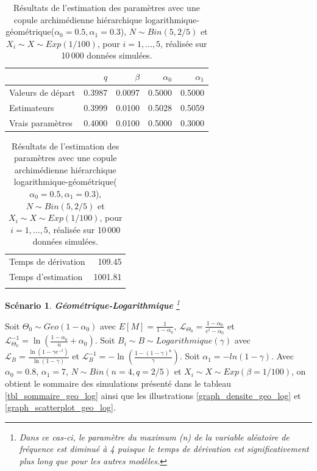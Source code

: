 \documentclass{article}
\newtheorem{Scenario}{Scénario}
\begin{document}
	\begin{table}[H]
		\centering
		\begin{tabular}{lrrrr}
			\hline
			& $q$ & $\beta$ & $\alpha_0$ & $\alpha_1$ \\ 
			\hline
			Valeurs de départ & 0.3987 & 0.0097 & 0.5000 & 0.5000 \\ 
			Estimateurs & 0.3999 & 0.0100 & 0.5028 & 0.5059 \\ 
			Vrais paramètres & 0.4000 & 0.0100 & 0.5000 & 0.3000 \\
			\hline
		\end{tabular}
		\begin{tabular}{lr}
			\hline
			&  \\ 
			\hline
			Temps de dérivation & 109.45 \\ 
			Temps d'estimation & 1001.81 \\ 
			\\
			\hline
		\end{tabular}
		\caption[Résultats du scénario \ref{scenario_log_geo}]{Résultats de l'estimation des paramètres avec une copule archimédienne hiérarchique logarithmique-géométrique($\alpha_0=0.5, \alpha_1 = 0.3$), $N \sim Bin(5, 2/5)$ et $X_i \sim X \sim Exp(1/100)$, pour $i=1,\dots,5$, réalisée sur 10\,000 données simulées.}
		\label{tbl_resultats_log_geo}
	\end{table}



	\begin{Scenario}\label{scenario_geo_log}
		\textbf{Géométrique-Logarithmique}
		\footnote{Dans ce cas-ci, le paramètre du maximum (n) de la variable aléatoire de fréquence est diminué à 4 puisque le temps de dérivation est significativement plus long que pour les autres modèles.}
	\end{Scenario}
	
	Soit $\Theta_0 \sim Geo(1-\alpha_0)$ avec $E[M] = \frac{1}{1-\alpha_0},\ \mathscr{L}_{\Theta_0} = \frac{1-\alpha_0}{e^t-\alpha_0}$ et $\mathscr{L}^{-1}_{\Theta_0} = \ln\left(\frac{1 - \alpha_0}{u}+\alpha_0\right)$.
	Soit $B_i \sim B \sim Logarithmique(\gamma)$ avec $\mathscr{L}_{B} = \frac{\ln(1-\gamma e^{-t})}{\ln(1-\gamma)}$ et $\mathscr{L}^{-1}_{B} = -\ln \left( \frac{1-(1-\gamma)^u}{\gamma} \right)$. Soit $\alpha_{1} = -ln(1-\gamma)$. Avec $\alpha_0 = 0.8$, $\alpha_1 = 7$, $N\sim Bin(n=4, q=2/5)$  et $X_i \sim X \sim Exp(\beta = 1/100)$, on obtient le sommaire des simulations présenté dans le tableau \ref{tbl_sommaire_geo_log} ainsi que les illustrations \ref{graph_densite_geo_log} et \ref{graph_scatterplot_geo_log}.
	
\end{document}
